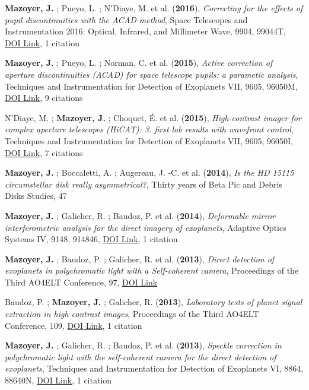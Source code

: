 \documentclass[11pt]{article}
\begin{document}
\begin{etaremune}
 \item {\bf Mazoyer, J.} ; Pueyo, L. ; N'Diaye, M. et al. ({\bf2016}), {\it Correcting for the effects of pupil discontinuities with the ACAD method}, Space Telescopes and Instrumentation 2016: Optical, Infrared, and Millimeter Wave, 9904, 99044T, \href{https://doi.org/10.1117/12.2232907}{DOI Link}, 1 citation

 \item {\bf Mazoyer, J.} ; Pueyo, L. ; Norman, C. et al. ({\bf2015}), {\it Active correction of aperture discontinuities (ACAD) for space telescope pupils: a parametic analysis}, Techniques and Instrumentation for Detection of Exoplanets VII, 9605, 96050M, \href{https://doi.org/10.1117/12.2188692}{DOI Link}, 9 citations

 \item N'Diaye, M. ; {\bf Mazoyer, J.} ; Choquet, {\'E}. et al. ({\bf2015}), {\it High-contrast imager for complex aperture telescopes (HiCAT): 3. first lab results with wavefront control}, Techniques and Instrumentation for Detection of Exoplanets VII, 9605, 96050I, \href{https://doi.org/10.1117/12.2188497}{DOI Link}, 7 citations

 \item {\bf Mazoyer, J.} ; Boccaletti, A. ; Augereau, J. -C. et al. ({\bf2014}), {\it Is the HD 15115 circumstellar disk really asymmetrical?}, Thirty years of Beta Pic and Debris Disks Studies, 47

 \item {\bf Mazoyer, J.} ; Galicher, R. ; Baudoz, P. et al. ({\bf2014}), {\it Deformable mirror interferometric analysis for the direct imagery of exoplanets}, Adaptive Optics Systems IV, 9148, 914846, \href{https://doi.org/10.1117/12.2057833}{DOI Link}, 1 citation

 \item {\bf Mazoyer, J.} ; Baudoz, P. ; Galicher, R. et al. ({\bf2013}), {\it Direct detection of exoplanets in polychromatic light with a Self-coherent camera}, Proceedings of the Third AO4ELT Conference, 97, \href{https://doi.org/10.12839/AO4ELT3.13416}{DOI Link}

 \item Baudoz, P. ; {\bf Mazoyer, J.} ; Galicher, R. ({\bf2013}), {\it Laboratory tests of planet signal extraction in high contrast images}, Proceedings of the Third AO4ELT Conference, 109, \href{https://doi.org/10.12839/AO4ELT3.13701}{DOI Link}, 1 citation

 \item {\bf Mazoyer, J.} ; Galicher, R. ; Baudoz, P. et al. ({\bf2013}), {\it Speckle correction in polychromatic light with the self-coherent camera for the direct detection of exoplanets}, Techniques and Instrumentation for Detection of Exoplanets VI, 8864, 88640N, \href{https://doi.org/10.1117/12.2023508}{DOI Link}, 1 citation


\end{etaremune}
\end{document}
